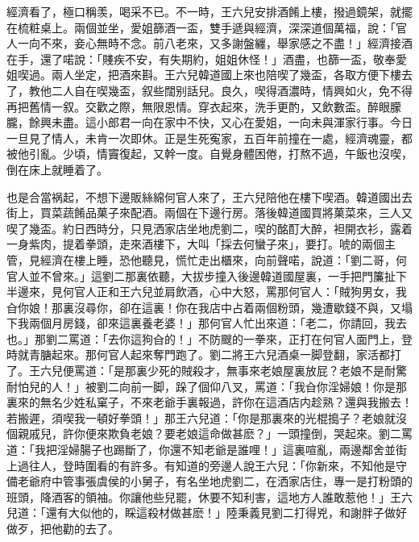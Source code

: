 經濟看了，極口稱羡，喝采不已。不一時，王六兒安排酒餚上樓，撥過鏡架，就擺在梳粧桌上。兩個並坐，愛姐篩酒一盃，雙手遞與經濟，深深道個萬福，說：「官人一向不來，妾心無時不念。前八老來，又多謝盤纏，舉家感之不盡！」經濟接酒在手，還了喏說：「賤疾不安，有失期約，姐姐休怪！」酒盡，也篩一盃，敬奉愛姐喫過。兩人坐定，把酒來斟。王六兒韓道國上來也陪喫了幾盃，各取方便下樓去了，教他二人自在喫幾盃，叙些闊别話兒。良久，喫得酒濃時，情興如火，免不得再把舊情一叙。交歡之際，無限恩情。穿衣起來，洗手更酌，又飲數盃。醉眼朦朧，餘興未盡。這小郎君一向在家中不快，又心在愛姐，一向未與渾家行事。今日一旦見了情人，未肯一次即休。正是生死寃家，五百年前撞在一處，經濟魂靈，都被他引亂。少頃，情竇復起，又幹一度。自覺身體困倦，打熬不過，午飯也沒喫，倒在床上就睡着了。

也是合當祸起，不想下邊販絲綿何官人來了，王六兒陪他在樓下喫酒。韓道國出去街上，買菜蔬餚品菓子來配酒。兩個在下邊行房。落後韓道國買將菓菜來，三人又喫了幾盃。約日西時分，只見洒家店坐地虎劉二，喫的酩酊大醉，袒開衣衫，露着一身紫肉，提着拳頭，走來酒樓下，大叫「採去何蠻子來」，要打。唬的兩個主管，見經濟在樓上睡，恐他聽見，慌忙走出櫃來，向前聲喏，說道：「劉二哥，何官人並不曾來。」這劉二那裏依聽，大拔步撞入後邊韓道國屋裏，一手把門簾扯下半邊來，見何官人正和王六兒並肩飲酒，心中大怒，罵那何官人：「賊狗男女，我㒲你娘！那裏沒尋你，卻在這裏！你在我店中占着兩個粉頭，幾遭歇錢不與，又塌下我兩個月房錢，卻來這裏養老婆！」那何官人忙出來道：「老二，你請回，我去也。」那劉二罵道：「去你這狗㒲的！」不防颼的一拳來，正打在何官人面門上，登時就青膅起來。那何官人起來奪門跑了。劉二將王六兒酒桌一脚登翻，家活都打了。王六兒便罵道：「是那裏少死的賊殺才，無事來老娘屋裏放屁？老娘不是耐驚耐怕兒的人！」被劉二向前一脚，跺了個仰八叉，罵道：「我㒲你淫婦娘！你是那裏來的無名少姓私窠子，不來老爺手裏報過，許你在這酒店内趁熟？還與我搬去！若搬遲，須喫我一頓好拳頭！」那王六兒道：「你是那裏來的光棍搗子？老娘就沒個親戚兒，許你便來欺負老娘？要老娘這命做甚麽？」一頭撞倒，哭起來。劉二罵道：「我把淫婦腸子也踢斷了，你還不知老爺是誰哩！」這裏喧亂，兩邊鄰舍並街上過往人，登時圍看的有許多。有知道的旁邊人說王六兒：「你新來，不知他是守備老爺府中管事張虞侯的小舅子，有名坐地虎劉二，在洒家店住，專一是打粉頭的班頭，降酒客的領袖。你讓他些兒罷，休要不知利害，這地方人誰敢惹他！」王六兒道：「還有大似他的，睬這殺材做甚麽！」陸秉義見劉二打得兇，和謝胖子做好做歹，把他勸的去了。

